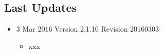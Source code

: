 \subsection{Last Updates}

\begin{itemize}

  \item 3 Mar 2016 Version 2.1.10 Revision 20160303
  \begin{itemize}
    \item xxx
  \end{itemize}

\end{itemize}

